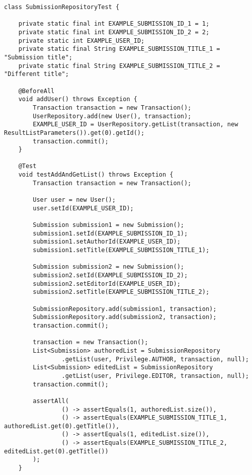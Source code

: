 \begin{lstlisting}[label={lst:SubmissionRepositoryTest},caption={SubmissionRepositoryTest.java}]
class SubmissionRepositoryTest {

    private static final int EXAMPLE_SUBMISSION_ID_1 = 1;
    private static final int EXAMPLE_SUBMISSION_ID_2 = 2;
    private static int EXAMPLE_USER_ID;
    private static final String EXAMPLE_SUBMISSION_TITLE_1 = "Submission title";
    private static final String EXAMPLE_SUBMISSION_TITLE_2 = "Different title";

    @BeforeAll
    void addUser() throws Exception {
        Transaction transaction = new Transaction();
        UserRepository.add(new User(), transaction);
        EXAMPLE_USER_ID = UserRepository.getList(transaction, new ResultListParameters()).get(0).getId();
        transaction.commit();
    }

    @Test
    void testAddAndGetList() throws Exception {
        Transaction transaction = new Transaction();

        User user = new User();
        user.setId(EXAMPLE_USER_ID);

        Submission submission1 = new Submission();
        submission1.setId(EXAMPLE_SUBMISSION_ID_1);
        submission1.setAuthorId(EXAMPLE_USER_ID);
        submission1.setTitle(EXAMPLE_SUBMISSION_TITLE_1);

        Submission submission2 = new Submission();
        submission2.setId(EXAMPLE_SUBMISSION_ID_2);
        submission2.setEditorId(EXAMPLE_USER_ID);
        submission2.setTitle(EXAMPLE_SUBMISSION_TITLE_2);

        SubmissionRepository.add(submission1, transaction);
        SubmissionRepository.add(submission2, transaction);
        transaction.commit();

        transaction = new Transaction();
        List<Submission> authoredList = SubmissionRepository
                .getList(user, Privilege.AUTHOR, transaction, null);
        List<Submission> editedList = SubmissionRepository
                .getList(user, Privilege.EDITOR, transaction, null);
        transaction.commit();

        assertAll(
                () -> assertEquals(1, authoredList.size()),
                () -> assertEquals(EXAMPLE_SUBMISSION_TITLE_1, authoredList.get(0).getTitle()),
                () -> assertEquals(1, editedList.size()),
                () -> assertEquals(EXAMPLE_SUBMISSION_TITLE_2, editedList.get(0).getTitle())
        );
    }


\end{lstlisting}
